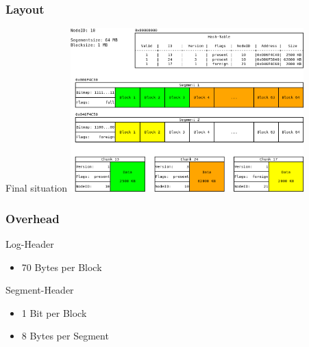\documentclass{beamer}
\begin{document}
	\begin{frame}
		\frametitle{Layout}

		\begin{block}{Final situation}
			\center\includegraphics[width=9cm]{./img/Log_Layout_04}
		\end{block}
	\end{frame}

	\begin{frame}
		\frametitle{Overhead}

		\begin{block}{Log-Header}
			\begin{itemize}
				\item 70 Bytes per Block
			\end{itemize}
		\end{block}

		\begin{block}{Segment-Header}
			\begin{itemize}
				\item 1 Bit per Block
				\item 8 Bytes per Segment
			\end{itemize}
		\end{block}
	\end{frame}
\end{document}
